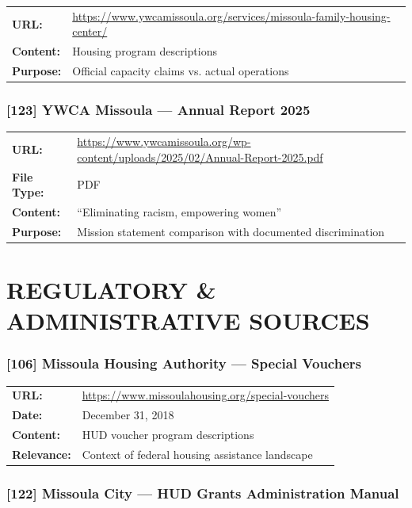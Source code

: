 \documentclass[11pt,letterpaper]{article}
\newcommand{\citeref}[1]{\textbf{\color{NavyBlue}[#1]}}
\begin{document}
\begin{tabular}{@{}p{1.4in}p{4.6in}@{}}
\textbf{URL:} & \url{https://www.ywcamissoula.org/services/missoula-family-housing-center/}\\
\textbf{Content:} & Housing program descriptions\\
\textbf{Purpose:} & Official capacity claims vs. actual operations\\
\end{tabular}

\subsubsection{\citeref{123} YWCA Missoula --- Annual Report 2025}

\begin{tabular}{@{}p{1.4in}p{4.6in}@{}}
\textbf{URL:} & \url{https://www.ywcamissoula.org/wp-content/uploads/2025/02/Annual-Report-2025.pdf}\\
\textbf{File Type:} & PDF\\
\textbf{Content:} & ``Eliminating racism, empowering women''\\
\textbf{Purpose:} & Mission statement comparison with documented discrimination\\
\end{tabular}

\newpage

\section{REGULATORY \& ADMINISTRATIVE SOURCES}

\subsubsection{\citeref{106} Missoula Housing Authority --- Special Vouchers}

\begin{tabular}{@{}p{1.4in}p{4.6in}@{}}
\textbf{URL:} & \url{https://www.missoulahousing.org/special-vouchers}\\
\textbf{Date:} & December 31, 2018\\
\textbf{Content:} & HUD voucher program descriptions\\
\textbf{Relevance:} & Context of federal housing assistance landscape\\
\end{tabular}

\subsubsection{\citeref{122} Missoula City --- HUD Grants Administration Manual}
\end{document}
